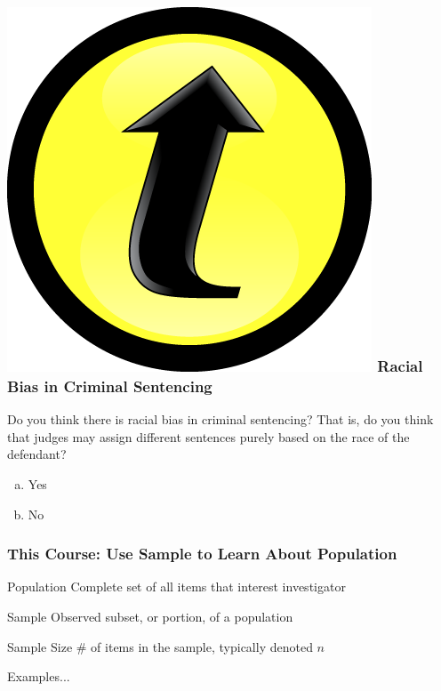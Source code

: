 \documentclass{beamer}
\begin{document}
\begin{frame}

\frametitle{\includegraphics[scale = 0.05]{./images/clicker} \hfill  Racial Bias in Criminal Sentencing}

Do you think there is racial bias in criminal sentencing? That is, do you think that judges may assign different sentences purely based on the race of the defendant?

\begin{enumerate}[(a)]
	\item Yes
	\item No
\end{enumerate}

\end{frame}



\begin{frame}
\frametitle{This Course: Use Sample to Learn About Population}


\begin{block}{Population}
Complete set of all items that interest investigator
\end{block}


\begin{block}{Sample}
Observed subset, or portion, of a population
\end{block}

\begin{block}{Sample Size}
\# of items in the sample, typically denoted $n$
\end{block}


\begin{block}{\hfill Examples...}\end{block}

\end{frame}
\end{document}
